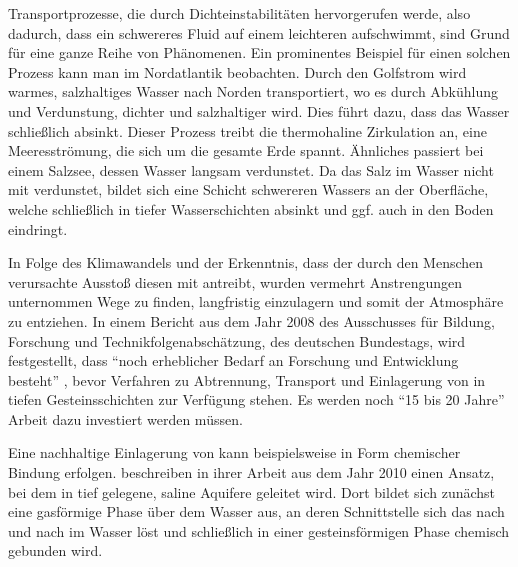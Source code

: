 
\label{cha:intro}


Transportprozesse, die durch Dichteinstabilitäten hervorgerufen werde, also dadurch, dass ein schwereres Fluid auf einem leichteren aufschwimmt, sind Grund für eine ganze Reihe von Phänomenen.
Ein prominentes Beispiel für einen solchen Prozess kann man im Nordatlantik beobachten. Durch den Golfstrom wird warmes, salzhaltiges Wasser nach Norden transportiert, wo es durch Abkühlung und Verdunstung, dichter und salzhaltiger wird. Dies führt dazu, dass das Wasser schließlich absinkt. Dieser Prozess treibt die thermohaline Zirkulation an, eine Meeresströmung, die sich um die gesamte Erde spannt. 
Ähnliches passiert bei einem Salzsee, dessen Wasser langsam verdunstet. Da das Salz im Wasser nicht mit verdunstet, bildet sich eine Schicht schwereren Wassers an der Oberfläche, welche schließlich in tiefer Wasserschichten absinkt und ggf. auch in den Boden eindringt.

In Folge des Klimawandels und der Erkenntnis, dass der durch den Menschen verursachte \COTm Ausstoß diesen mit antreibt, wurden vermehrt Anstrengungen unternommen Wege zu finden, \COT langfristig einzulagern und somit der Atmosphäre zu entziehen. 
In einem Bericht aus dem Jahr 2008 des Ausschusses für Bildung, Forschung und Technikfolgenabschätzung, des deutschen Bundestags, wird festgestellt, dass ``noch erheblicher Bedarf an Forschung und Entwicklung besteht'' \citep{taccs}, bevor Verfahren zu Abtrennung, Transport und Einlagerung von \COT in tiefen Gesteinsschichten zur Verfügung stehen. Es werden noch ``15 bis 20 Jahre'' Arbeit dazu investiert werden müssen.

Eine nachhaltige Einlagerung von \COT kann beispielsweise in Form chemischer Bindung erfolgen. \cite{kneafsy} beschreiben in ihrer Arbeit aus dem Jahr 2010 einen Ansatz, bei dem \COT in tief gelegene, saline Aquifere geleitet wird. Dort bildet sich zunächst eine gasförmige Phase über dem Wasser aus, an deren Schnittstelle sich das \COT nach und nach im Wasser löst und schließlich in einer gesteinsförmigen Phase chemisch gebunden wird. 

